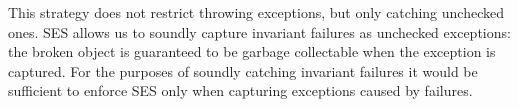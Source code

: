 
\noindent This strategy does not restrict throwing exceptions, but only catching unchecked ones.
SES allows us to soundly capture invariant failures as unchecked exceptions: 
the broken object is guaranteed to be garbage collectable when the exception is captured. For the purposes of soundly catching invariant failures it would be sufficient to enforce SES only when capturing exceptions caused by \Q@invariant@ failures.





% 





